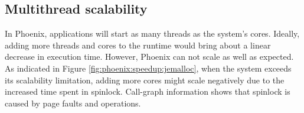 




\subsection{Multithread scalability}
In Phoenix, applications will start as many threads as the system's cores.
Ideally, adding more threads and cores to the runtime would bring about a linear decrease in execution time.
However, Phoenix can not scale as well as expected.
As indicated in Figure \ref{fig:phoenix:speedup:jemalloc}, when the system exceeds its scalability limitation, adding more cores might scale negatively due to the increased time spent in spinlock.
Call-graph information shows that spinlock is caused by page faults and  operations.

%

